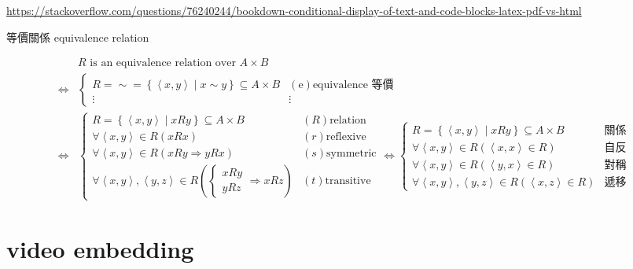 \documentclass[
]{book}
\theoremstyle{definition}
\theoremstyle{definition}
\theoremstyle{definition}
\theoremstyle{definition}
\theoremstyle{remark}
\begin{document}
\url{https://stackoverflow.com/questions/76240244/bookdown-conditional-display-of-text-and-code-blocks-latex-pdf-vs-html}

\begin{CJK}{UTF8}{bsmi}等價關係 equivalence relation \label{def:equivalence-relation}
\end{CJK}
\begin{CJK}{UTF8}{bsmi}
\begin{align*}
 & R\text{ is an equivalence relation over }A\times B\\
\Leftrightarrow & \begin{cases}
R=\sim=\left\{ \left\langle x,y\right\rangle \middle|x\sim y\right\} \subseteq A\times B & \left(\text{e}\right)\text{equivalence 等價}\\
\vdots & \vdots
\end{cases}\\
\Leftrightarrow & \begin{cases}
R=\left\{ \left\langle x,y\right\rangle \middle|xRy\right\} \subseteq A\times B & \left(R\right)\text{relation}\\
\forall\left\langle x,y\right\rangle \in R\left(xRx\right) & \left(r\right)\text{reflexive}\\
\forall\left\langle x,y\right\rangle \in R\left(xRy\Rightarrow yRx\right) & \left(s\right)\text{symmetric}\\
\forall\left\langle x,y\right\rangle ,\left\langle y,z\right\rangle \in R\left(\begin{cases}
xRy\\
yRz
\end{cases}\Rightarrow xRz\right) & \left(t\right)\text{transitive}
\end{cases}\Leftrightarrow\begin{cases}
R=\left\{ \left\langle x,y\right\rangle \middle|xRy\right\} \subseteq A\times B & \text{關係}\\
\forall\left\langle x,y\right\rangle \in R\left(\left\langle x,x\right\rangle \in R\right) & \text{自反}\\
\forall\left\langle x,y\right\rangle \in R\left(\left\langle y,x\right\rangle \in R\right) & \text{對稱}\\
\forall\left\langle x,y\right\rangle ,\left\langle y,z\right\rangle \in R\left(\left\langle x,z\right\rangle \in R\right) & \text{遞移}
\end{cases}
\end{align*}
\end{CJK}

\hypertarget{video-embedding}{%
\section{video embedding}\label{video-embedding}}
\end{document}
